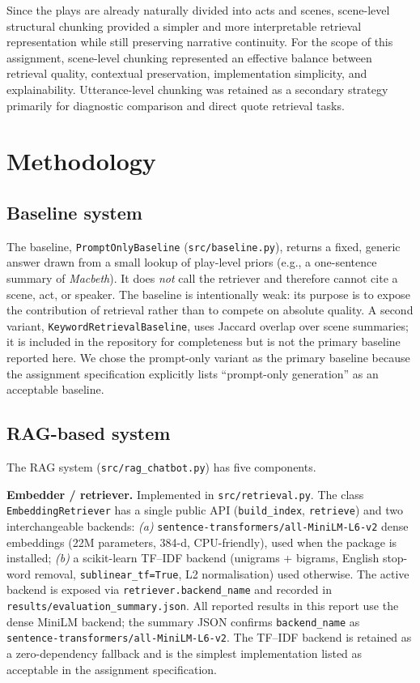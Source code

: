 \documentclass[10pt,conference]{IEEEtran}
\begin{document}
Since the plays are already naturally divided into acts and scenes, scene-level structural chunking provided a simpler and more interpretable retrieval representation while still preserving narrative continuity. For the scope of this assignment, scene-level chunking represented an effective balance between retrieval quality, contextual preservation, implementation simplicity, and explainability. Utterance-level chunking was retained as a secondary strategy primarily for diagnostic comparison and direct quote retrieval tasks.

\section{Methodology}
\label{sec:methodology}


\subsection{Baseline system}

The baseline, \verb|PromptOnlyBaseline| (\verb|src/baseline.py|),
returns a fixed, generic answer drawn from a small lookup of
play-level priors (e.g., a one-sentence summary of \emph{Macbeth}).
It does \emph{not} call the retriever and therefore cannot cite a
scene, act, or speaker. The baseline is intentionally weak: its
purpose is to expose the contribution of retrieval rather than to
compete on absolute quality. A second variant,
\verb|KeywordRetrievalBaseline|, uses Jaccard overlap over scene
summaries; it is included in the repository for completeness but is
not the primary baseline reported here. We chose the prompt-only
variant as the primary baseline because the assignment specification
explicitly lists ``prompt-only generation'' as an acceptable baseline.

\subsection{RAG-based system}

The RAG system (\verb|src/rag_chatbot.py|) has five components.

\textbf{Embedder / retriever.} Implemented in
\verb|src/retrieval.py|. The class \verb|EmbeddingRetriever| has a
single public API (\verb|build_index|, \verb|retrieve|) and two
interchangeable backends:
\textit{(a)} \verb|sentence-transformers/all-MiniLM-L6-v2| dense
embeddings (22M parameters, 384-d, CPU-friendly), used when the
package is installed;
\textit{(b)} a scikit-learn TF--IDF backend (unigrams + bigrams,
English stop-word removal, \verb|sublinear_tf=True|, L2 normalisation)
used otherwise. The active backend is exposed via
\verb|retriever.backend_name| and recorded in
\verb|results/evaluation_summary.json|. All reported results in this
report use the dense MiniLM backend; the summary JSON confirms
\texttt{backend\_name} as \texttt{sentence-transformers/all-MiniLM-L6-v2}.
The TF--IDF backend is retained as a zero-dependency fallback and is
the simplest implementation listed as acceptable in the assignment
specification.
\end{document}
